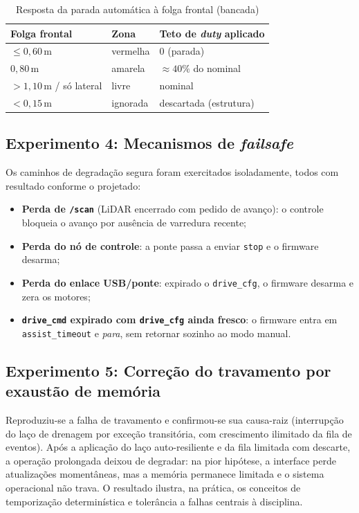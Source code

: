 \documentclass[conference]{IEEEtran}
\begin{document}
\begin{table}[!t]
\caption{Resposta da parada automática à folga frontal (bancada)}
\label{tab:zonas}
\centering
\footnotesize
\renewcommand{\arraystretch}{1.2}
\begin{tabular}{@{}p{}p{}p{}@{}}
\hline
\textbf{Folga frontal} & \textbf{Zona} & \textbf{Teto de \emph{duty} aplicado} \\
\hline
$\le 0{,}60$\,m            & vermelha & $0$ (parada) \\
$0{,}80$\,m                & amarela  & $\approx 40\%$ do nominal \\
$> 1{,}10$\,m / só lateral & livre    & nominal \\
$< 0{,}15$\,m              & ignorada & descartada (estrutura) \\
\hline
\end{tabular}
\end{table}

\subsection{Experimento 4: Mecanismos de \emph{failsafe}}

Os caminhos de degradação segura foram exercitados isoladamente, todos com
resultado conforme o projetado:

\begin{itemize}
\item \textbf{Perda de \texttt{/scan}} (LiDAR encerrado com pedido de avanço):
o controle bloqueia o avanço por ausência de varredura recente;
\item \textbf{Perda do nó de controle}: a ponte passa a enviar \texttt{stop} e
o firmware desarma;
\item \textbf{Perda do enlace USB/ponte}: expirado o \texttt{drive\_cfg}, o
firmware desarma e zera os motores;
\item \textbf{\texttt{drive\_cmd} expirado com \texttt{drive\_cfg} ainda
fresco}: o firmware entra em \texttt{assist\_timeout} e \emph{para}, sem
retornar sozinho ao modo manual.
\end{itemize}

\subsection{Experimento 5: Correção do travamento por exaustão de memória}

Reproduziu-se a falha de travamento e confirmou-se sua causa-raiz (interrupção
do laço de drenagem por exceção transitória, com crescimento ilimitado da fila
de eventos). Após a aplicação do laço auto-resiliente e da fila limitada com
descarte, a operação prolongada deixou de degradar: na pior hipótese, a
interface perde atualizações momentâneas, mas a memória permanece limitada e o
sistema operacional não trava. O resultado ilustra, na prática, os conceitos de
temporização determinística e tolerância a falhas centrais à disciplina.
\end{document}
